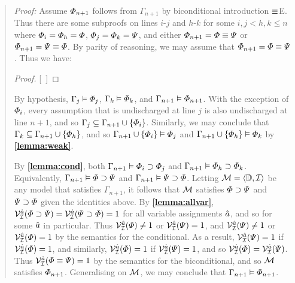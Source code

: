 
\begin{quote} 
  \textit{Proof:} Assume $\varPhi_{n+1}$ follows from $\Gamma_{n+1}$ by biconditional introduction $\equiv$E.
  Thus there are some subproofs on lines $i$-$j$ and $h$-$k$ for some $i,j<h,k\leq n$ where $\varPhi_i=\varPhi_h=\varPhi$, $\varPhi_j=\varPhi_k=\varPsi$, and either $\varPhi_{n+1}=\varPhi\equiv\varPsi$ or $\varPhi_{n+1}=\varPsi\equiv\varPhi$.
  By parity of reasoning, we may assume that $\varPhi_{n+1}=\varPhi\equiv\varPsi$.
  Thus we have:

  \begin{proof}
    \open
       
    \close
    \open
       
    \close
    [\ ]{\metaA \eiff \metaB} 
  \end{proof}

  By hypothesis, $\Gamma_j\vDash \varPhi_j$, $\Gamma_k\vDash \varPhi_k$, and $\Gamma_{n+1}\vDash \varPhi_{n+1}$.
  With the exception of $\varPhi_i$, every assumption that is undischarged at line $j$ is also undischarged at line $n+1$, and so $\Gamma_j\subseteq\Gamma_{n+1}\cup\lbrace\varPhi_i\rbrace$.
  Similarly, we may conclude that $\Gamma_k\subseteq\Gamma_{n+1}\cup\lbrace\varPhi_h\rbrace$, and so $\Gamma_{n+1}\cup\lbrace\varPhi_i\rbrace \vDash \varPhi_j$ and $\Gamma_{n+1}\cup\lbrace\varPhi_h\rbrace \vDash \varPhi_k$ by \textbf{\ref{lemma:weak}}.

  By \textbf{\ref{lemma:cond}}, both $\Gamma_{n+1} \vDash \varPhi_i \supset \varPhi_j$ and $\Gamma_{n+1} \vDash \varPhi_h \supset \varPhi_k$.
  Equivalently, $\Gamma_{n+1} \vDash \varPhi \supset \varPsi$ and $\Gamma_{n+1} \vDash \varPsi \supset \varPhi$.
  Letting $\mathcal{M}=\langle\mathbb{D},\mathcal{I}\rangle$ be any model that satisfies $\Gamma_{n+1}$, it follows that $\mathcal{M}$ satisfies $\varPhi \supset \varPsi$ and $\varPsi \supset \varPhi$ given the identities above.
  By \textbf{\ref{lemma:allvar}}, $\mathcal{V}_{\mathcal{I}}^{\hat{a}}(\varPhi \supset \varPsi)=\mathcal{V}_{\mathcal{I}}^{\hat{a}}(\varPsi \supset \varPhi)=1$ for all variable assignments $\hat{a}$, and so for some $\hat{a}$ in particular. 
  Thus $\mathcal{V}_{\mathcal{I}}^{\hat{a}}(\varPhi)\neq 1$ or $\mathcal{V}_{\mathcal{I}}^{\hat{a}}(\varPsi)=1$, and $\mathcal{V}_{\mathcal{I}}^{\hat{a}}(\varPsi)\neq 1$ or $\mathcal{V}_{\mathcal{I}}^{\hat{a}}(\varPhi)=1$ by the semantics for the conditional.
  As a result, $\mathcal{V}_{\mathcal{I}}^{\hat{a}}(\varPsi)=1$ if $\mathcal{V}_{\mathcal{I}}^{\hat{a}}(\varPhi)=1$, and similarly, $\mathcal{V}_{\mathcal{I}}^{\hat{a}}(\varPhi)=1$ if $\mathcal{V}_{\mathcal{I}}^{\hat{a}}(\varPsi)=1$, and so $\mathcal{V}_{\mathcal{I}}^{\hat{a}}(\varPhi)=\mathcal{V}_{\mathcal{I}}^{\hat{a}}(\varPsi)$.
  Thus $\mathcal{V}_{\mathcal{I}}^{\hat{a}}(\varPhi \equiv \varPsi)=1$ by the semantics for the biconditional, and so $\mathcal{M}$ satisfies $\varPhi_{n+1}$.
  Generalising on $\mathcal{M}$, we may conclude that $\Gamma_{n+1}\vDash\varPhi_{n+1}$.
\end{quote}





